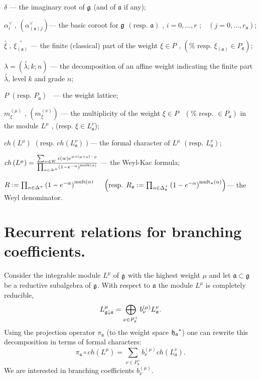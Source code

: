 \documentclass[12pt]{iopart}
\theoremstyle{definition}
\newcommand{\co}[1]{\stackrel{\circ }{#1}}
\newcommand{\af}{\mathfrak{a}}
\begin{document}
$\delta $ --- the imaginary root of $\frak{g}$ (and of $\af$ if any);

$\alpha _{i}^{\vee }$ , $\left( \alpha _{\left( \af\right) j}^{\vee
}\right) $--- the basic coroot for $\frak{g}$ $\left( \mbox{resp. }\af%
\right) $ , $i=0,\ldots ,r$ ;\ \ $\left( j=0,\ldots ,r_{\af}\right) $;

$\co{\xi }$ , $\co{\xi _{\left( \af\right) }}$
--- the finite (classical) part of the weight $\xi \in P$ , $\left( \mbox{%
resp. }\xi _{\left( \af\right) }\in P_{\af}\right) $;

$\lambda =\left( \co{\lambda };k;n\right) $ --- the
decomposition of an affine weight indicating the finite part $\co{\lambda }$, level $k$ and grade $n$;

$P$ $\left( \mbox{resp. } P_{\af}\right) $ \ --- the weight lattice;

$m_{\xi }^{\left( \mu \right) }$ , $\left( m_{\xi }^{\left( \nu \right)
}\right) $ --- the multiplicity of the weight $\xi \in P$ \ $\left( \mbox{%
resp. }\in P_{\af}\right) $ in the module $L^{\mu }$ , (resp. $\xi \in
L_{\af}^{\nu } $);

$ch\left( L^{\mu }\right) $ $\left( \mbox{resp. }ch\left( L_{\af}^{\nu
}\right) \right) $--- the formal character of $L^{\mu }$ $\left( \mbox{resp. }%
L_{\af}^{\nu }\right) $;

$ch\left( L^{\mu }\right) =\frac{\sum_{w\in W}\epsilon (w)e^{w\circ (\mu
+\rho )-\rho }}{\prod_{\alpha \in \Delta ^{+}}\left( 1-e^{-\alpha }\right) ^{%
\mathrm{{mult}\left( \alpha \right) }}}$ --- the Weyl-Kac formula;

$R:=\prod_{\alpha \in \Delta ^{+}}\left( 1-e^{-\alpha }\right) ^{\mathrm{{%
mult}\left( \alpha \right) }}\quad $
$\left( \mbox{resp. }R_{\af}:=\prod_{\alpha \in \Delta _{%
\af}^{+}}\left( 1-e^{-\alpha }\right) ^{\mathrm{mult}_{\af}\mathrm{%
\left( \alpha \right) }}\right) $--- the Weyl denominator.



\section{Recurrent relations for branching coefficients.}
\label{sec:recurr-form-branch}

Consider the integrable module $L^{\mu }$
of $\frak{g}$ with the highest weight $\mu $ and
let $\af\subset \frak{g}$ be a reductive subalgebra of $\frak{g}$.
With respect to $\af$ the module $L^{\mu }$ is completely reducible,
\begin{equation*}
 L_{\frak{g}\downarrow \af}^{\mu }=\bigoplus
\limits_{\nu \in P_{\af}^{+}}b_{\nu }^{\left( \mu \right) }L_{\af}^{\nu }.
\end{equation*}
Using the projection operator $\pi_{\af}$ (to the weight space $\frak{h_a}^*$)
one can  rewrite this decomposition in terms of formal characters:
\begin{equation}
\label{branching1}
 \pi _{\af}\circ ch\left( L^{\mu }\right)
 =\sum_{\nu \in P_{\af}^{+}}b_{\nu }^{(\mu)}ch\left( L_{\af}^{\nu }\right) .
\end{equation}
We are interested in branching coefficients $b^{(\mu)}_{\nu}$.
\end{document}
